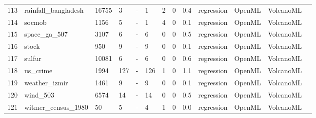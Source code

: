 \begin{table*}
\begin{tabular}{lllllllllllll}
113 & rainfall\_bangladesh                        & 16755   & 3      & -     & 1     & 2      & 0         & 0.4       & regression  & OpenML & VolcanoML        \\
114 & socmob                                      & 1156    & 5      & -     & 1     & 4      & 0         & 0.1       & regression  & OpenML & VolcanoML        \\
115 & space\_ga\_507                              & 3107    & 6      & -     & 6     & 0      & 0         & 0.5       & regression  & OpenML & VolcanoML        \\
116 & stock                                       & 950     & 9      & -     & 9     & 0      & 0         & 0.1       & regression  & OpenML & VolcanoML        \\
117 & sulfur                                      & 10081   & 6      & -     & 6     & 0      & 0         & 0.6       & regression  & OpenML & VolcanoML        \\
118 & us\_crime                                   & 1994    & 127    & -     & 126   & 1      & 0         & 1.1       & regression  & OpenML & VolcanoML        \\
119 & weather\_izmir                              & 1461    & 9      & -     & 9     & 0      & 0         & 0.1       & regression  & OpenML & VolcanoML        \\
120 & wind\_503                                   & 6574    & 14     & -     & 14    & 0      & 0         & 0.5       & regression  & OpenML & VolcanoML        \\
121 & witmer\_census\_1980                        & 50      & 5      & -     & 4     & 1      & 0         & 0.0       & regression  & OpenML & VolcanoML        \\
\bottomrule
\end{tabular}

\label{tab:dataset_stats_volcano}
\end{table*}

